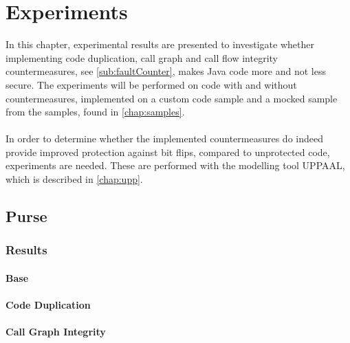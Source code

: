 \chapter{Experiments}
In this chapter, experimental results are presented to investigate whether implementing code duplication, call graph and call flow integrity countermeasures, see \cref{sub:faultCounter}, makes Java code more and not less secure. The experiments will be performed on code with and without countermeasures, implemented on a custom code sample and a mocked sample from the \jc samples, found in \cref{chap:samples}.\\\\
In order to determine whether the implemented countermeasures do indeed provide improved protection against bit flips, compared to unprotected code, experiments are needed. These are performed with the modelling tool UPPAAL, which is described in \cref{chap:upp}.
%
\section{\jc Purse}

\subsection*{Results}

\subsubsection{Base}

\subsubsection{Code Duplication}

\subsubsection{Call Graph Integrity}

